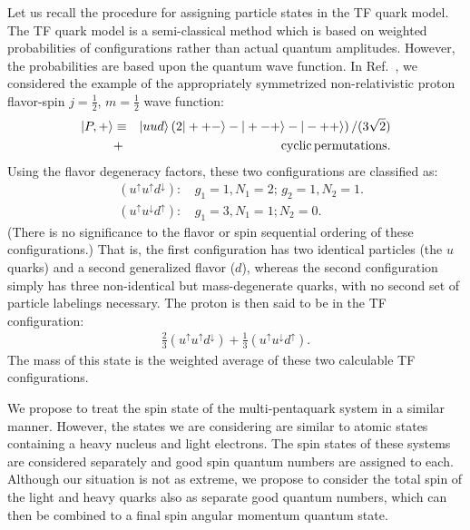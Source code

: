 \documentclass[preprint,12pt]{elsarticle}
\begin{document}
    Let us recall the procedure for assigning particle states in the TF quark model. The TF quark model is a semi-classical method which is based on weighted probabilities of configurations rather than actual quantum amplitudes. However, the probabilities are based upon the quantum wave function. In Ref.~\cite{Liu:2012my}, we considered the example of the appropriately symmetrized non-relativistic proton flavor-spin $j=\frac{1}{2}$, $m=\frac{1}{2}$ wave function:
    \begin{eqnarray}
        |P,+\rangle &\equiv& |uud\rangle \left(2|++-\rangle-|+-+\rangle
        - |-++\rangle\right)/(3\sqrt{2}) \nonumber \\
        &+& {\rm cyclic\, permutations}.
        \label{proton}
    \end{eqnarray}
    Using the flavor degeneracy factors, these two configurations are classified as:
    \begin{eqnarray*}
    & (u^{\uparrow}u^{\uparrow}d^{\downarrow}):& \, g_1=1, N_1=2;\, g_2=1, N_2=1.\\ 
    & (u^{\uparrow}u^{\downarrow}d^{\uparrow}):& \, g_1=3, N_1=1; N_2=0.  \label{pconfig3}
    \end{eqnarray*}
    (There is no significance to the flavor or spin sequential ordering of these configurations.) That is, the first configuration has two identical particles (the $u$ quarks) and a second generalized flavor ($d$), whereas the second configuration simply has three non-identical but mass-degenerate quarks, with no second set of particle labelings necessary. The proton is then said to be in the TF configuration:
    \begin{eqnarray*}
    \frac{2}{3}(u^{\uparrow}u^{\uparrow}d^{\downarrow})+\frac{1}{3}(u^{\uparrow}u^{\downarrow}d^{\uparrow}).   \label{pconfig2}
    \end{eqnarray*}
    The mass of this state is the weighted average of these two calculable TF configurations.
    
    We propose to treat the spin state of the multi-pentaquark system in a similar manner. However, the states we are considering are similar to atomic states containing a heavy nucleus and light electrons. The spin states of these systems are considered separately and good spin quantum numbers are assigned to each. Although our situation is not as extreme, we propose to consider the total spin of the light and heavy quarks also as separate good quantum numbers, which can then be combined to a final spin angular momentum quantum state. 
    
\end{document}
